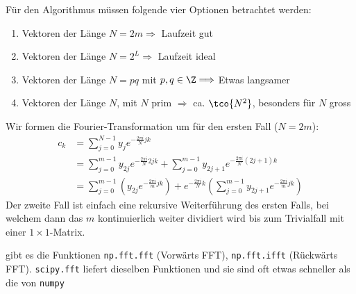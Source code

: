 Für den Algorithmus müssen folgende vier Optionen betrachtet werden:
\begin{enumerate}[label=\Roman*]
    \item Vektoren der Länge $N = 2m \Longrightarrow$ Laufzeit gut
    \item Vektoren der Länge $N = 2^L \Longrightarrow$ Laufzeit ideal
    \item Vektoren der Länge $N = pq$ mit $p, q \in \Z \Longrightarrow$ Etwas langsamer
    \item Vektoren der Länge $N$, mit $N$ prim $\Longrightarrow$ ca. $\tco{N^2}$, besonders für $N$ gross
\end{enumerate}
Wir formen die Fourier-Transformation um für den ersten Fall ($N = 2m$):
\rmvspace
\begin{align*}
    c_k & = \sum_{j = 0}^{N - 1} y_j e^{- \frac{2\pi i}{N} jk}                                                                     \\
        & = \sum_{j = 0}^{m - 1} y_{2j} e^{-\frac{2 \pi i}{N}2jk} + \sum_{j = 0}^{m - 1} y_{2j + 1} e^{-\frac{2\pi i}{N}(2j + 1)k} \\
        & = \sum_{j = 0}^{m - 1} \left( y_{2j} e^{-\frac{2 \pi i}{m}jk} \right)
    + e^{- \frac{2\pi i}{N} k} \left( \sum_{j = 0}^{m - 1} y_{2j + 1} e^{-\frac{2\pi i}{m}jk} \right)
\end{align*}
Der zweite Fall ist einfach eine rekursive Weiterführung des ersten Falls,
bei welchem dann das $m$ kontinuierlich weiter dividiert wird bis zum Trivialfall mit einer $1 \times 1$-Matrix.

\innumpy gibt es die Funktionen \texttt{np.fft.fft} (Vorwärts FFT), \texttt{np.fft.ifft} (Rückwärts FFT). 
\texttt{scipy.fft} liefert dieselben Funktionen und sie sind oft etwas schneller als die von \texttt{numpy}
